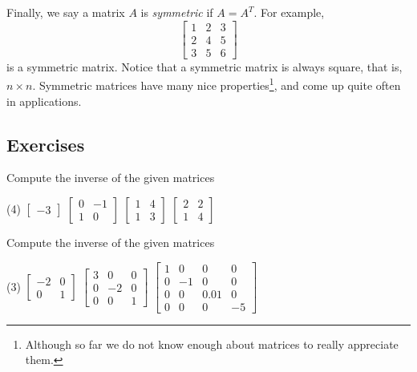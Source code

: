 Finally, we say a matrix $A$ is \emph{symmetric}
if $A = A^T$.  For example,
\begin{equation*}
\begin{bmatrix}
1 & 2 & 3 \\
2 & 4 & 5 \\
3 & 5 & 6
\end{bmatrix}
\end{equation*}
is a symmetric matrix.  Notice that a symmetric matrix is always
square, that is, $n \times n$.  Symmetric matrices 
have many nice properties\footnote{Although so far we do not know enough
about matrices to really appreciate them.},
and come up quite often in applications.

\subsection{Exercises}

\begin{exercise}
Compute the inverse of the given matrices
\begin{tasks}(4)
\task
$\begin{bmatrix}
-3
\end{bmatrix}$
\task
$\begin{bmatrix}
0 & -1 \\
1 & 0
\end{bmatrix}$
\task
$\begin{bmatrix}
1 & 4 \\
1 & 3
\end{bmatrix}$
\task
$\begin{bmatrix}
2 & 2 \\
1 & 4
\end{bmatrix}$
\end{tasks}
\end{exercise}

\begin{exercise}
Compute the inverse of the given matrices
\begin{tasks}(3)
\task
$\begin{bmatrix}
-2 & 0 \\
0 & 1 
\end{bmatrix}$
\task
$\begin{bmatrix}
3 & 0 & 0 \\
0 & -2 & 0 \\ 
0 & 0 & 1
\end{bmatrix}$
\task
$\begin{bmatrix}
1 & 0 & 0 & 0 \\
0 & -1 & 0 & 0 \\ 
0 & 0 & 0.01 & 0 \\
0 & 0 & 0 & -5
\end{bmatrix}$
\end{tasks}
\end{exercise}

